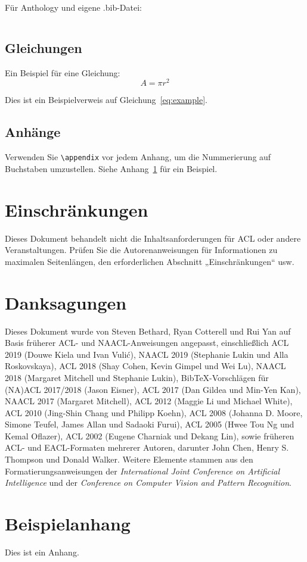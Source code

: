 \documentclass[11pt]{article}
\begin{document}
Für Anthology und eigene .bib-Datei:
\begin{quote}
\begin{verbatim}

\end{verbatim}
\end{quote}

\subsection{Gleichungen}

Ein Beispiel für eine Gleichung:
\begin{equation}
  \label{eq:example}
  A = \pi r^2
\end{equation}

Dies ist ein Beispielverweis auf Gleichung~\ref{eq:example}.

\subsection{Anhänge}

Verwenden Sie \verb|\appendix| vor jedem Anhang, um die Nummerierung auf Buchstaben umzustellen. Siehe Anhang~\ref{sec:appendix} für ein Beispiel.

\section*{Einschränkungen}

Dieses Dokument behandelt nicht die Inhaltsanforderungen für ACL oder andere Veranstaltungen. Prüfen Sie die Autorenanweisungen für Informationen zu maximalen Seitenlängen, den erforderlichen Abschnitt „Einschränkungen“ usw.

\section*{Danksagungen}

Dieses Dokument wurde von Steven Bethard, Ryan Cotterell und Rui Yan
auf Basis früherer ACL- und NAACL-Anweisungen angepasst, einschließlich
ACL 2019 (Douwe Kiela und Ivan Vuli\'{c}),
NAACL 2019 (Stephanie Lukin und Alla Roskovskaya),
ACL 2018 (Shay Cohen, Kevin Gimpel und Wei Lu),
NAACL 2018 (Margaret Mitchell und Stephanie Lukin),
Bib\TeX{}-Vorschlägen für (NA)ACL 2017/2018 (Jason Eisner),
ACL 2017 (Dan Gildea und Min-Yen Kan),
NAACL 2017 (Margaret Mitchell),
ACL 2012 (Maggie Li und Michael White),
ACL 2010 (Jing-Shin Chang und Philipp Koehn),
ACL 2008 (Johanna D. Moore, Simone Teufel, James Allan und Sadaoki Furui),
ACL 2005 (Hwee Tou Ng und Kemal Oflazer),
ACL 2002 (Eugene Charniak und Dekang Lin),
sowie früheren ACL- und EACL-Formaten mehrerer Autoren, darunter
John Chen, Henry S. Thompson und Donald Walker.
Weitere Elemente stammen aus den Formatierungsanweisungen der \emph{International Joint Conference on Artificial Intelligence} und der \emph{Conference on Computer Vision and Pattern Recognition}.



\appendix

\section{Beispielanhang}
\label{sec:appendix}

Dies ist ein Anhang.
\end{document}
